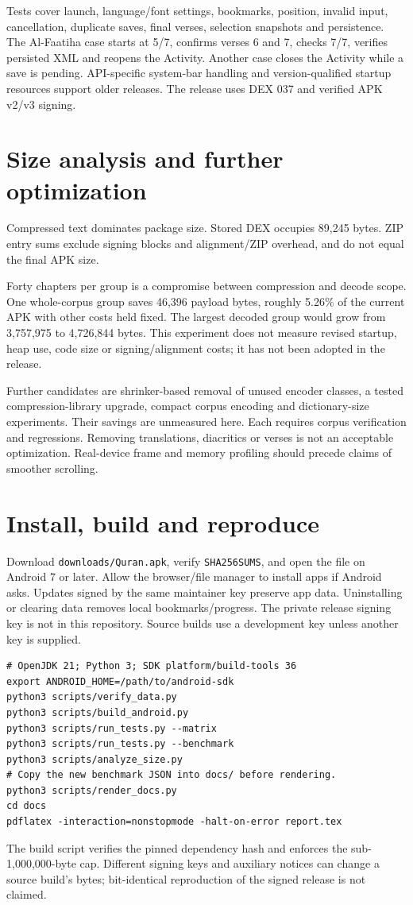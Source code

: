 \documentclass[11pt,a4paper]{article}
\begin{document}
Tests cover launch, language/font settings, bookmarks, position, invalid
input, cancellation, duplicate saves, final verses, selection snapshots
and persistence. The Al-Faatiha case starts at 5/7, confirms verses 6 and 7,
checks 7/7, verifies persisted XML and reopens the Activity. Another case
closes the Activity while a save is pending. API-specific system-bar
handling and version-qualified startup resources support older releases.
The release uses DEX 037 and verified APK v2/v3 signing.

\section{Size analysis and further optimization}
Compressed text dominates package size. Stored DEX occupies 89,245 bytes.
ZIP entry sums exclude signing blocks and alignment/ZIP overhead, and do
not equal the final APK size.

Forty chapters per group is a compromise between compression and decode
scope. One whole-corpus group saves 46,396 payload bytes, roughly 5.26\%
of the current APK with other costs held fixed. The largest decoded group
would grow from 3,757,975 to 4,726,844 bytes. This experiment does not
measure revised startup, heap use, code size or signing/alignment costs;
it has not been adopted in the release.

Further candidates are shrinker-based removal of unused encoder classes,
a tested compression-library upgrade, compact corpus encoding and
dictionary-size experiments. Their savings are unmeasured here. Each
requires corpus verification and regressions. Removing translations,
diacritics or verses is not an acceptable optimization. Real-device frame
and memory profiling should precede claims of smoother scrolling.

\section{Install, build and reproduce}
Download \texttt{downloads/Quran.apk}, verify \texttt{SHA256SUMS}, and open
the file on Android 7 or later. Allow the browser/file manager to install
apps if Android asks. Updates signed by the same maintainer key preserve
app data. Uninstalling or clearing data removes local bookmarks/progress.
The private release signing key is not in this repository. Source builds
use a development key unless another key is supplied.
\begin{lstlisting}[basicstyle=\ttfamily\small,breaklines=true]
# OpenJDK 21; Python 3; SDK platform/build-tools 36
export ANDROID_HOME=/path/to/android-sdk
python3 scripts/verify_data.py
python3 scripts/build_android.py
python3 scripts/run_tests.py --matrix
python3 scripts/run_tests.py --benchmark
python3 scripts/analyze_size.py
# Copy the new benchmark JSON into docs/ before rendering.
python3 scripts/render_docs.py
cd docs
pdflatex -interaction=nonstopmode -halt-on-error report.tex
\end{lstlisting}
The build script verifies the pinned dependency hash and enforces the
sub-1,000,000-byte cap. Different signing keys and auxiliary notices can
change a source build's bytes; bit-identical reproduction of the signed
release is not claimed.
\end{document}
